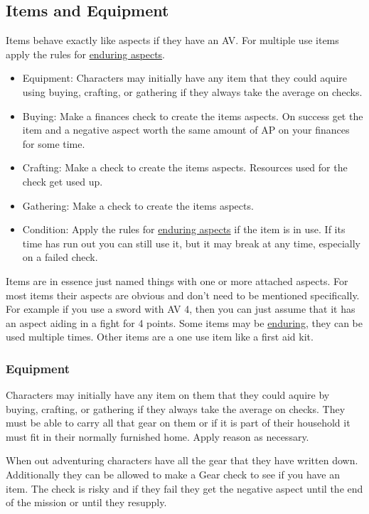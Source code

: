 \documentclass[11pt]{article}
\begin{document}
{\subsection{Items and Equipment}
\label{sec:org7f9cd72}
\begin{short}
Items behave exactly like aspects if they have an AV. For multiple use items apply the rules for \hyperref[sec:org97ab889]{enduring aspects}. 
\begin{itemize}
\item Equipment: Characters may initially have any item that they could aquire using buying, crafting, or gathering if they always take the average on checks.
\item Buying: Make a finances check to create the items aspects. On success get the item and a negative aspect  worth the same amount of AP on your finances for some time.
\item Crafting: Make a check to create the items aspects. Resources used for the check get used up.
\item Gathering: Make a check to create the items aspects.
\item Condition: Apply the rules for \hyperref[sec:org97ab889]{enduring aspects} if the item is in use. If its time has run out you can still use it, but it may break at any time, especially on a failed check.
\end{itemize}
\end{short}

Items are in essence just named things with one or more attached aspects. For most items their aspects are obvious and don't need to be mentioned specifically. For example if you use a sword with AV 4, then you can just assume that it has an aspect aiding in a fight for 4 points. Some items may be \hyperref[sec:org97ab889]{enduring}, they can be used multiple times. Other items are a one use item like a first aid kit. 
\subsubsection{Equipment}
\label{sec:org95e3c9f}
Characters may initially have any item on them that they could aquire by buying, crafting, or gathering if they always take the average on checks. They must be able to carry all that gear on them or if it is part of their household it must fit in their normally furnished home. Apply reason as necessary.

When out adventuring characters have all the gear that they have written down. Additionally they can be allowed to make a Gear check to see if you have an item. The check is risky and if they fail they get the negative aspect  until the end of the mission or until they resupply.
}
\end{document}
